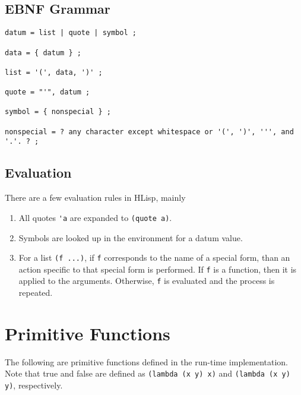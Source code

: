 \documentclass[12pt]{article}
\begin{document}
\subsection{EBNF Grammar}

\begin{verbatim}
datum = list | quote | symbol ;

data = { datum } ;

list = '(', data, ')' ;

quote = "'", datum ;

symbol = { nonspecial } ;

nonspecial = ? any character except whitespace or '(', ')', ''', and '.'. ? ;
\end{verbatim}

\subsection{Evaluation}

There are a few evaluation rules in HLisp, mainly

\begin{enumerate}
\item All quotes \verb!'a! are expanded to \verb!(quote a)!.

\item Symbols are looked up in the environment for a datum value.

\item For a list \verb!(f ...)!, if \verb!f! corresponds to the name of a
  special form, than an action specific to that special form is performed. If
  \verb!f! is a function, then it is applied to the arguments. Otherwise,
  \verb!f! is evaluated and the process is repeated.
\end{enumerate}

\section{Primitive Functions}

The following are primitive functions defined in the run-time implementation.
Note that true and false are defined as \verb!(lambda (x y) x)! and
\verb!(lambda (x y) y)!, respectively.
\end{document}
